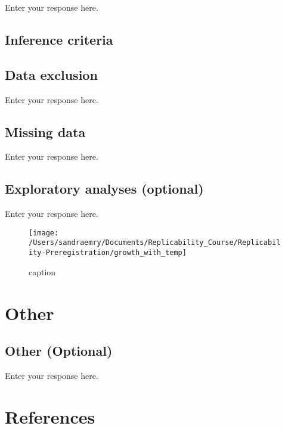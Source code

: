 \documentclass[]{article}
\begin{document}
Enter your response here.

\hypertarget{inference-criteria}{%
\subsection{Inference criteria}\label{inference-criteria}}

\hypertarget{data-exclusion}{%
\subsection{Data exclusion}\label{data-exclusion}}

Enter your response here.

\hypertarget{missing-data}{%
\subsection{Missing data}\label{missing-data}}

Enter your response here.

\hypertarget{exploratory-analyses-optional}{%
\subsection{Exploratory analyses
(optional)}\label{exploratory-analyses-optional}}

Enter your response here.

\begin{figure}
\texttt{[image: /Users/sandraemry/Documents/Replicability\_Course/Replicability-Preregistration/growth\_with\_temp]} \caption{caption}\label{fig:growth with temp}
\end{figure}

\hypertarget{other}{%
\section{Other}\label{other}}

\hypertarget{other-optional}{%
\subsection{Other (Optional)}\label{other-optional}}

Enter your response here.

\hypertarget{references}{%
\section{References}\label{references}}

\hypertarget{section}{%
\subsection{}\label{section}}

\vspace{-2pc}
\setlength{\parindent}{-0.5in}
\setlength{\leftskip}{-1in}
\setlength{\parskip}{8pt}

\noindent
\end{document}

